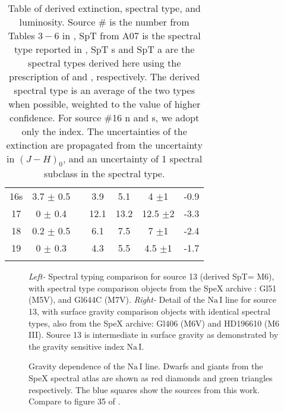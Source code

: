 \begin{center}
{\begin{table}
\begin{tabular}{ccccccc}
16s	&	3.7	$\pm$	0.5	& &	3.9	&	5.1	&	4	$\pm$1	&	-0.9	\\
17	&	0	$\pm$	0.4	& &	12.1	&	13.2	&	12.5	$\pm$2	&	-3.3	\\
18	&	0.2	$\pm$	0.5	& &	6.1	&	7.5	&	7	$\pm$1	&	-2.4	\\
19	&	0	$\pm$	0.3	& &	4.3	&	5.5	&	4.5	$\pm$1	&	-1.7	\\
\noalign{\smallskip}
\hline
\end{tabular}
 \caption{Table of derived extinction, spectral type, and luminosity.  Source \# is the number from Tables $3-6$ in \citet{allers06}, SpT from A07 is the spectral type reported in \citet{allers07}, SpT s and SpT a are the spectral types derived here using the prescription of \citet{slesnick04} and \citet{allers07}, respectively.  The derived spectral type is an average of the two types when possible, weighted to the value of higher confidence.  For source \#16 n and s, we adopt only the \citet{slesnick04} index.  The uncertainties of the extinction are propagated from the uncertainty in $(J-H)_{0}$, and an uncertainty of 1 spectral subclass in the spectral type.}
 \end{table}
}
\end{center}

\begin{figure}[!ht]
\caption{\emph{Left-} Spectral typing comparison for source 13 (derived SpT= M6), with spectral type comparison objects from the SpeX archive \citep{rayner09,cushing05}: Gl51 (M5V), and Gl644C (M7V).  \emph{Right-} Detail of the $\mathrm{Na\, I}$ line for source 13, with surface gravity comparison objects with identical spectral types, also from the SpeX archive: Gl406 (M6V) and HD196610 (M6 III).  Source 13 is intermediate in surface gravity as demonstrated by the gravity sensitive index $\mathrm{Na\, I}$.}
\end{figure}

\begin{figure}[!ht]
\caption{Gravity dependence of the $\mathrm{Na\, I}$ line.  Dwarfs and giants from the SpeX spectral atlas are shown as red diamonds and green triangles respectively.  The blue squares show the sources from this work.  Compare to figure 35 of \citet{rayner09}.}
\end{figure}

